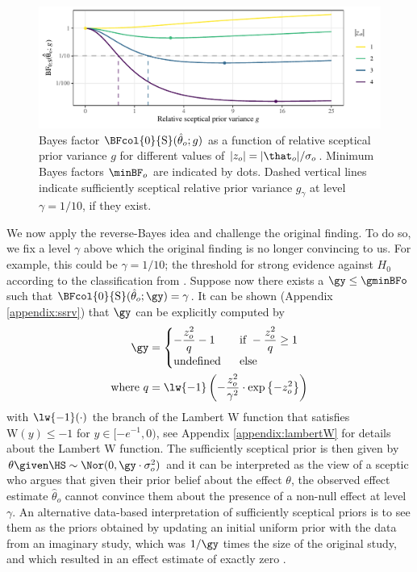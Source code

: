 \begin{figure}[!htb]
\begin{knitrout}
\color{fgcolor}
\includegraphics[width=\maxwidth]{images/paper2/plot-BFo-1.pdf}
\end{knitrout}
\caption{Bayes factor $\BFcol{0}{\mathrm{S}}(\hat{\theta}_o; g)$ as a function of
relative sceptical prior variance $g$ for different values of
$|z_o| = |\that_o|/\sigma_o$. Minimum Bayes factors $\minBF_{o}$ are indicated
by dots. Dashed vertical lines indicate sufficiently sceptical relative prior
variance $g_{\scriptscriptstyle \gamma}$ at level $\gamma = 1/10$, if they
exist.}
\label{fig2:bfo}
\end{figure}

We now apply the reverse-Bayes idea and challenge the original finding. To do
so, we fix a level $\gamma$ above which the original finding is no longer
convincing to us. For example, this could be $\gamma = 1/10$; the threshold for
strong evidence against $H_0$ according to the classification from
\citet{Jeffreys1961}. Suppose now there exists a $\gy \leq \gminBFo$ such that
$\BFcol{0}{\mathrm{S}}(\hat{\theta}_o; \gy) = \gamma$. It can be shown (Appendix
\ref{appendix:ssrv}) that $\gy$ can be explicitly computed by
\begin{align}
\label{ggamma}
  \gy &=
  \begin{cases}
    -\dfrac{z_o^2}{q} - 1 & ~~ \text{if} ~ -\dfrac{z_o^2}{q} \geq 1 \\
    \text{undefined} & ~~ \text{else}
  \end{cases} \\
  \text{where} ~ q &= \lw{-1} \left(-\frac{z_o^2}{\gamma^2} \cdot
  \exp\left\{-z_o^2\right\}\right)
  \nonumber
\end{align}
with $\lw{-1}(\cdot)$ the branch of the Lambert W function \citep{Corless1996}
that satisfies \mbox{$\mathrm{W}(y) \leq -1$} for $y \in [-e^{-1}, 0)$, see
Appendix \ref{appendix:lambertW} for details about the Lambert W function. The
sufficiently sceptical prior is then given by
$\theta \given \HS \sim \Nor(0, \gy \cdot \sigma^2_o)$ and it can be interpreted
as the view of a sceptic who argues that given their prior belief about the
effect $\theta$, the observed effect estimate $\hat{\theta}_o$ cannot convince
them about the presence of a non-null effect at level $\gamma$. An alternative
data-based interpretation of sufficiently sceptical priors is to see them as the
priors obtained by updating an initial uniform prior with the data from an
imaginary study, which was $1/\gy$ times the size of the original study, and
which resulted in an effect estimate of exactly zero \citep{Held2021b}.

